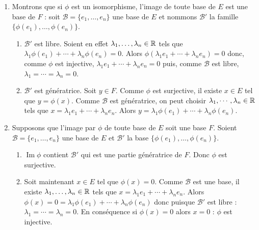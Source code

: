 \documentclass[11pt,a4paper]{article}
\renewcommand{\Im}{\mathop{\mathrm{Im}}\nolimits}
\begin{document}
\begin{enumerate}
    \item Montrons que si  $\phi $  est un isomorphisme,
l'image de toute base de  $E$  est une base de  $F$ : soit
$\mathcal{B} =\{ e_1, \ldots , e_n \} $  une base de  $E$  et
nommons  $\mathcal{B} ' $  la famille  $\{ \phi (e_1), \ldots ,
\phi (e_n) \} $.
    \begin{enumerate}
        \item $\mathcal{B} '$  est libre. Soient en effet  $\lambda _1 , \ldots , \lambda _n\in {\mathbb{R}}$  tels
que  $\lambda _1\phi (e_1)+ \cdots + \lambda _n \phi (e_n)
=0 $. Alors  $ \phi (\lambda _1e_1+ \cdots + \lambda _ne_n) =0
$  donc, comme  $\phi$  est injective,  $\lambda _1e_1+ \cdots
+ \lambda _ne_n=0$  puis, comme  $\mathcal{B} $  est libre,
$\lambda _1=\cdots =\lambda _n=0$.
        \item $\mathcal{B} '$  est g\' en\' eratrice. Soit  $y\in F$. Comme  $\phi $  est surjective, il
existe  $x\in E$  tel que  $y=\phi (x)$. Comme  $\mathcal{B}$
est g\' en\' eratrice, on peut choisir   $\lambda _1 , \cdots ,
\lambda _n\in {\mathbb{R}}$  tels que  $x=\lambda _1 e_1 +\cdots + \lambda
_n e_n $. Alors  $y=\lambda _1\phi (e_1)+ \cdots + \lambda _n
\phi (e_n)  $.
    \end{enumerate}
    \item Supposons que l'image par  $\phi $  de toute base de  $E$  soit une base  $F$. Soient  $\mathcal{B}
=\{ e_1,\ldots , e_n\} $  une base de  $E$  et  $\mathcal{B} ' $
la base  $\{ \phi (e_1), \ldots , \phi (e_n) \} $.
    \begin{enumerate}
        \item $\Im \phi$  contient  $\mathcal{B} '$  qui est une partie g\' en\' eratrice de $F$. Donc  $\phi $  est surjective.
        \item Soit maintenant  $x\in E$  tel que  $\phi (x)=0$.
Comme  $\mathcal{B} $  est une base, il existe  $\lambda _1 ,
\ldots , \lambda _n\in {\mathbb{R}}$  tels que  $x= \lambda _1e_1+ \cdots
+ \lambda _ne_n$. Alors  $\phi (x)=0=\lambda _1\phi (e_1)+
\cdots + \lambda _n \phi (e_n) $ donc puisque  $\mathcal{B} '$
est libre :  $\lambda _1=\cdots =\lambda _n=0$. En cons\' equence
si  $\phi (x)=0$  alors  $x=0$ : $\phi$  est injective.
    \end{enumerate}
\end{enumerate}
\end{document}
